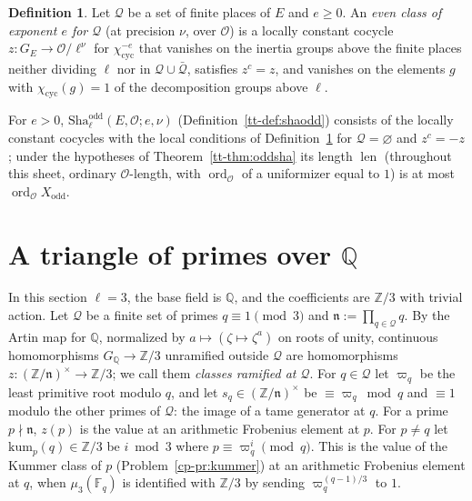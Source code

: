 \documentclass[reqno]{amsart}
\theoremstyle{definition}
\newtheorem{definition}{Definition}[section]
\theoremstyle{plain}
\newcommand{\Z}{\mathbb{Z}}
\newcommand{\Q}{\mathbb{Q}}
\newcommand{\Oc}{\mathcal{O}}
\newcommand{\cyc}{\chi_{\mathrm{cyc}}}
\newcommand{\ord}{\operatorname{ord}}
\newcommand{\len}{\operatorname{len}}
\newcommand{\Shao}{\mathrm{Sha}^{\mathrm{odd}}}
\begin{document}
\begin{definition}\label{def:even}
Let \(\mathcal Q\) be a set of finite places of \(E\) and \(e \ge 0\).  An \emph{even class of exponent \(e\) for \(\mathcal Q\)} (at precision \(\nu\), over \(\Oc\)) is a locally constant cocycle \(z \colon G_E \to \Oc/\ell^\nu\) for \(\cyc^{-e}\) that vanishes on the inertia groups above the finite places neither dividing \(\ell\) nor in \(\mathcal Q \cup \bar{\mathcal Q}\), satisfies \(z^c = z\), and vanishes on the elements \(g\) with \(\cyc(g) = 1\) of the decomposition groups above \(\ell\).
\end{definition}

For \(e > 0\), \(\Shao_\ell(E,\Oc;e,\nu)\) (Definition~\ref{tt-def:shaodd}) consists of the locally constant cocycles with the local conditions of Definition~\ref{def:even} for \(\mathcal Q = \varnothing\) and \(z^c = -z\); under the hypotheses of Theorem~\ref{tt-thm:oddsha} its length \(\len\) (throughout this sheet, ordinary \(\Oc\)-length, with \(\ord_{\Oc}\) of a uniformizer equal to \(1\)) is at most \(\ord_{\Oc} X_{\mathrm{odd}}\).

\section{A triangle of primes over \texorpdfstring{\(\Q\)}{Q}}\label{sec:toy}

In this section \(\ell = 3\), the base field is \(\Q\), and the coefficients are \(\Z/3\) with trivial action.  Let \(\mathcal Q\) be a finite set of primes \(q \equiv 1 \pmod 3\) and \(\mathfrak n := \prod_{q \in \mathcal Q} q\).  By the Artin map for \(\Q\), normalized by \(a \mapsto (\zeta \mapsto \zeta^a)\) on roots of unity, continuous homomorphisms \(G_{\Q} \to \Z/3\) unramified outside \(\mathcal Q\) are homomorphisms \(z \colon (\Z/\mathfrak n)^\times \to \Z/3\); we call them \emph{classes ramified at \(\mathcal Q\)}.  For \(q \in \mathcal Q\) let \(\varpi_q\) be the least primitive root modulo \(q\), and let \(s_q \in (\Z/\mathfrak n)^\times\) be \(\equiv \varpi_q \bmod q\) and \(\equiv 1\) modulo the other primes of \(\mathcal Q\): the image of a tame generator at \(q\).  For a prime \(p \nmid \mathfrak n\), \(z(p)\) is the value at an arithmetic Frobenius element at \(p\).  For \(p \ne q\) let \(\mathrm{kum}_p(q) \in \Z/3\) be \(i \bmod 3\) where \(p \equiv \varpi_q^i \pmod q\).  This is the value of the Kummer class of \(p\) (Problem~\ref{cp-pr:kummer}) at an arithmetic Frobenius element at \(q\), when \(\mu_3(\mathbb F_q)\) is identified with \(\Z/3\) by sending \(\varpi_q^{(q-1)/3}\) to \(1\).
\end{document}
